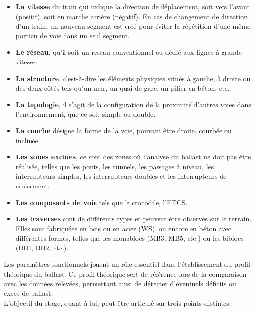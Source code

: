 \begin{itemize}
\item \textbf{La vitesse} du train qui indique la direction de déplacement, soit vers l'avant (positif), soit en marche arrière (négatif). En cas de changement de direction d'un train, un nouveau segment est créé pour éviter la répétition d'une même portion de voie dans un seul segment.

\item \textbf{Le réseau}, qu'il soit un réseau conventionnel ou dédié aux lignes à grande vitesse.

\item \textbf{La structure}, c'est-à-dire les éléments physiques situés à gauche, à droite ou des deux côtés tels qu'un mur, un quai de gare, un pilier en béton, etc.

\item \textbf{La topologie}, il s'agit de la configuration de la proximité d'autres voies dans l'environnement, que ce soit simple ou double.

\item \textbf{La courbe} désigne la forme de la voie, pouvant être droite, courbée ou inclinée.

\item \textbf{Les zones exclues}, ce sont des zones où l'analyse du ballast ne doit pas être réalisée, telles que les ponts, les tunnels, les passages à niveau, les interrupteurs simples, les interrupteurs doubles et les interrupteurs de croisement.

\item \textbf{Les composants de voie} tels que le \gls{crocodile}, l'\gls{ETCS}.

\item \textbf{Les traverses} sont de différents types et peuvent être observés sur le terrain. Elles sont fabriquées en bois ou en acier (WS), ou encore en béton avec différentes formes, telles que les monoblocs (MB3, MB5, etc.) ou les biblocs (BB1, BB2, etc.). \cite{RHEA}
\end{itemize}


\noindent Les paramètres fonctionnels jouent un rôle essentiel dans l'établissement du profil théorique du ballast. Ce profil théorique sert de référence lors de la comparaison avec les données relevées, permettant ainsi de détecter d'éventuels déficits ou excès de ballast.\\

\noindent L'objectif du stage, quant à lui, peut être articulé sur trois points distintcs. 

